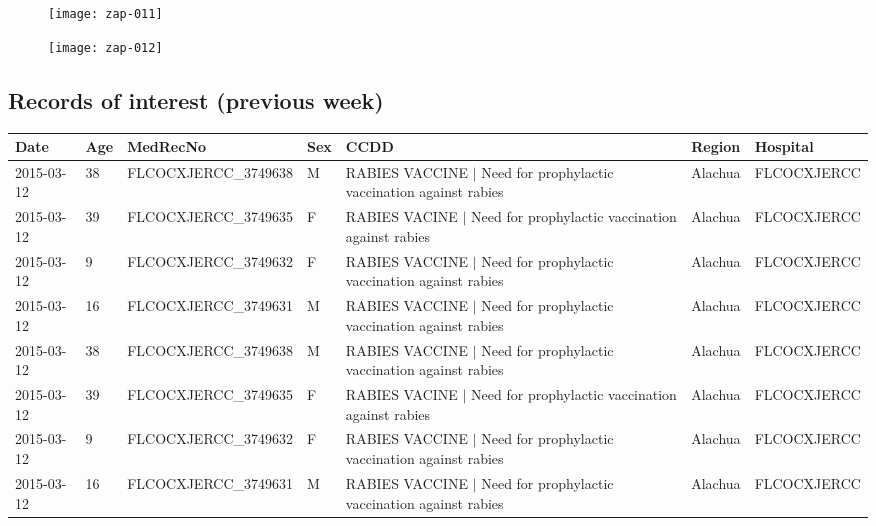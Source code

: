 \documentclass[12pt]{article}
\begin{document}
\begin{figure}[H]
\begin{center}
\texttt{[image: zap-011]}
\end{center}
\end{figure}
\vspace{-10mm}

\begin{figure}[H]
\begin{center}
\texttt{[image: zap-012]}
\end{center}
\end{figure}
\vspace{-10mm}





\begin{center}
\section*{Records of interest (previous week)}
\end{center}



\begin{table}[H]
\begin{table}[ht]
\centering
{\tiny
\begin{tabular}{lllllll}
  \hline
Date & Age & MedRecNo & Sex & CCDD & Region & Hospital \\ 
  \hline
2015-03-12 & 38 & FLCOCXJERCC\_3749638 & M & RABIES VACCINE $|$ Need for prophylactic vaccination against rabies & Alachua & FLCOCXJERCC \\ 
  2015-03-12 & 39 & FLCOCXJERCC\_3749635 & F & RABIES VACINE $|$ Need for prophylactic vaccination against rabies & Alachua & FLCOCXJERCC \\ 
  2015-03-12 & 9 & FLCOCXJERCC\_3749632 & F & RABIES VACCINE $|$ Need for prophylactic vaccination against rabies & Alachua & FLCOCXJERCC \\ 
  2015-03-12 & 16 & FLCOCXJERCC\_3749631 & M & RABIES VACCINE $|$ Need for prophylactic vaccination against rabies & Alachua & FLCOCXJERCC \\ 
  2015-03-12 & 38 & FLCOCXJERCC\_3749638 & M & RABIES VACCINE $|$ Need for prophylactic vaccination against rabies & Alachua & FLCOCXJERCC \\ 
  2015-03-12 & 39 & FLCOCXJERCC\_3749635 & F & RABIES VACINE $|$ Need for prophylactic vaccination against rabies & Alachua & FLCOCXJERCC \\ 
  2015-03-12 & 9 & FLCOCXJERCC\_3749632 & F & RABIES VACCINE $|$ Need for prophylactic vaccination against rabies & Alachua & FLCOCXJERCC \\ 
  2015-03-12 & 16 & FLCOCXJERCC\_3749631 & M & RABIES VACCINE $|$ Need for prophylactic vaccination against rabies & Alachua & FLCOCXJERCC \\ 
   \hline
\end{tabular}
}
\end{table}\end{table}
\end{document}
